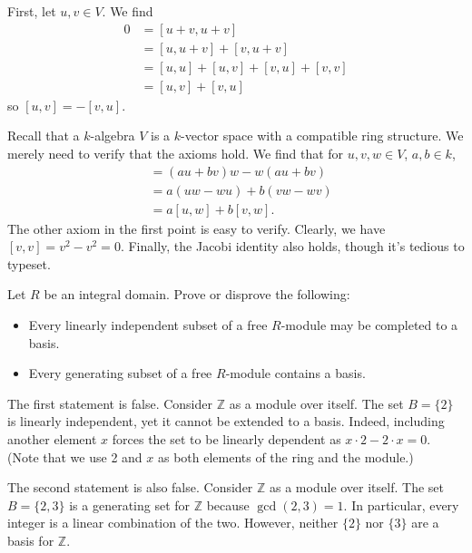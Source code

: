 \documentclass[../../master.tex]{subfiles}
\begin{document}
\begin{solution}
    First, let $u, v \in V$.
    We find
    \begin{align*}
        0 &= [u + v, u + v] \\
          &= [u, u + v] + [v, u + v] \\
          &= [u, u] + [u, v] + [v, u] + [v, v] \\
          &= [u, v] + [v, u] 
    \end{align*}
    so $[u, v] = -[v, u]$.

    Recall that a $k$-algebra $V$ is a $k$-vector space with a compatible ring structure.
    We merely need to verify that the axioms hold.
    We find that for $u, v, w \in V$, $a, b \in k$,
    \begin{align*}
        [au + bv, w] &= (au + bv) w - w (au + bv) \\
                     &= a(uw - wu) + b(vw - wv) \\
                     &= a[u, w] + b[v, w].
    \end{align*} 
    The other axiom in the first point is easy to verify.
    Clearly, we have $[v, v] = v^2 - v^2 = 0$.
    Finally, the Jacobi identity also holds, though it's tedious to typeset.
\end{solution}

\begin{problem}
    Let $R$ be an integral domain.
    Prove or disprove the following:
    \begin{itemize}
        \item Every linearly independent subset of a free $R$-module may be completed to a basis.
        \item Every generating subset of a free $R$-module contains a basis.
    \end{itemize}
\end{problem}

\begin{solution}
    The first statement is false.
    Consider $\mathbb{Z}$ as a module over itself.
    The set $B = \{2\}$ is linearly independent, yet it cannot be extended to a basis.
    Indeed, including another element $x$ forces the set to be linearly dependent as $x \cdot 2 - 2 \cdot x = 0$.
    (Note that we use 2 and $x$ as both elements of the ring and the module.)

    The second statement is also false.
    Consider $\mathbb{Z}$ as a module over itself.
    The set $B = \{2, 3\}$ is a generating set for $\mathbb{Z}$ because $\gcd(2, 3) = 1$.
    In particular, every integer is a linear combination of the two.
    However, neither $\{2\}$ nor $\{3\}$ are a basis for $\mathbb{Z}$.
\end{solution}
\end{document}

